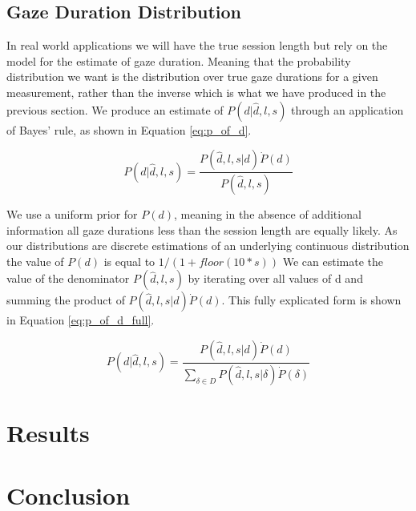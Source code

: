 \documentclass[12pt,a4paper]{article}
\numberwithin{equation}{section}
\begin{document}
\subsection{Gaze Duration Distribution}

In real world applications we will have the true session length but rely on the model for the 
estimate of gaze duration. Meaning that the probability distribution we want is the distribution 
over true gaze durations for a given measurement, rather than the inverse which is what we 
have produced in the previous section. We produce an estimate of $P(d|\hat{d},l,s)$
through an application of Bayes' rule, as shown in Equation \ref{eq:p_of_d}.

\begin{equation}
\label{eq:p_of_d}
P(d|\hat{d},l,s) =  \frac{ P(\hat{d},l,s|d) \dot P(d) }{ P(\hat{d},l,s)  }
\end{equation}

We use a uniform prior for $P(d)$, meaning in the absence of additional information all
gaze durations less than the session length are equally likely. As our distributions are
discrete estimations of an underlying continuous distribution the value of $P(d)$ is
equal to $1/(1+floor(10*s))$
 We can estimate the value
of the denominator $P(\hat{d},l,s)$ by iterating over all values of d and summing the product
of $ P(\hat{d},l,s|d) \dot P(d)$. This fully explicated form is shown in 
Equation \ref{eq:p_of_d_full}.

\begin{equation}
\label{eq:p_of_d_full}
P(d|\hat{d},l,s) =  \frac{ P(\hat{d},l,s|d) \dot P(d) }{ \sum_{\delta \in D} P(\hat{d},l,s|\delta) \dot P(\delta)  }
\end{equation}


\section{Results}


\section{Conclusion}




\end{document}
